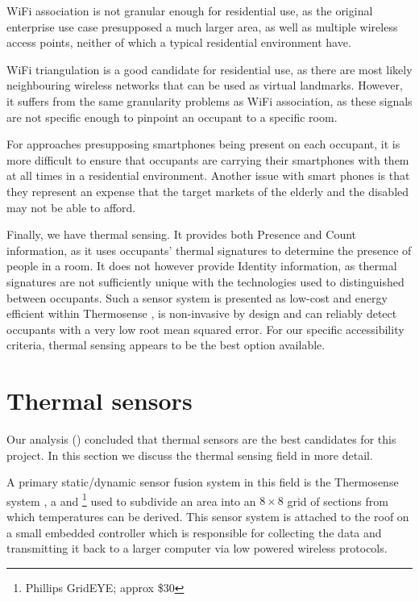 \documentclass[../thesis/thesis.tex]{subfiles}
\begin{document}
WiFi association is not granular enough for residential use, as the original enterprise use case presupposed a much larger area, as well as multiple wireless access points, neither of which a typical residential environment have.

WiFi triangulation is a good candidate for residential use, as there are most likely neighbouring wireless networks that can be used as virtual landmarks. However, it suffers from the same granularity problems as WiFi association, as these signals are not specific enough to pinpoint an occupant to a specific room.

For approaches presupposing smartphones being present on each occupant, it is more difficult to ensure that occupants are carrying their smartphones with them at all times in a residential environment.  Another issue with smart phones is that they represent an expense that the target markets of the elderly and the disabled may not be able to afford.

Finally, we have thermal sensing. It provides both Presence and Count information, as it uses occupants' thermal signatures to determine the presence of people in a room. It does not however provide Identity information, as thermal signatures are not sufficiently unique with the technologies used to distinguished between occupants. Such a sensor system is presented as low-cost and energy efficient within Thermosense \cite{beltran2013thermosense}, is non-invasive by design and can reliably detect occupants with a very low root mean squared error. For our specific accessibility criteria, thermal sensing appears to be the best option available.

\section{Thermal sensors}
\label{sec:litreview:thermalsensors}
Our analysis () concluded that thermal sensors are the best candidates for this project. In this section we discuss the thermal sensing field in more detail.

A primary static/dynamic sensor fusion system in this field is the Thermosense system \cite{beltran2013thermosense}, a \pir and \iar\footnote{Phillips GridEYE; approx \$30} used to subdivide an area into an $8\times8$ grid of sections from which temperatures can be derived. This sensor system is attached to the roof on a small embedded controller which is responsible for collecting the data and transmitting it back to a larger computer via low powered wireless protocols.
\end{document}
